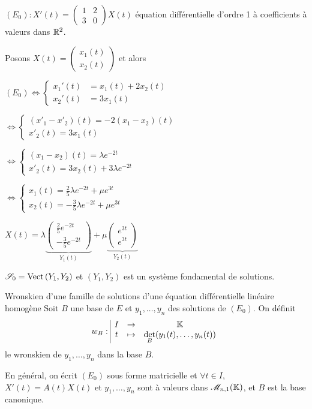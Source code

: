 \begin{exemple}
    $(E_0) : X'(t) = \begin{pmatrix}
        1 & 2 \\ 
        3 & 0
    \end{pmatrix} X(t)$ équation différentielle d'ordre 1 à coefficients à valeurs dans $\mathbb{R}^2$. 

    Posons $X(t) = \begin{pmatrix}
        x_1(t) \\ x_2(t)
    \end{pmatrix}$ et alors 

    $(E_0) \Leftrightarrow \begin{cases}
        x_1'(t) & = x_1(t) + 2x_2(t) \\
        x_2'(t) & = 3x_1(t)
    \end{cases}$

    $\Leftrightarrow \begin{cases}
        (x'_1 - x'_2)(t) = -2 (x_1 - x_2)(t) \\
        x'_2(t) = 3 x_1(t)
    \end{cases}$

    \svspace $\Leftrightarrow \begin{cases}
        (x_1 - x_2)(t) = \lambda e^{-2t} \\
        x'_2(t) = 3x_2(t) + 3 \lambda e^{-2t}
    \end{cases}$

    \svspace $\Leftrightarrow \begin{cases}
        x_1(t) = \frac 2 5 \lambda e^{-2t} + \mu e^{3t} \\
        x_2(t) = -\frac 3 5 \lambda e^{-2t} + \mu e^{3t}
    \end{cases}$

    \svspace $X(t) = \lambda \underbrace{\begin{pmatrix}
        \frac 2 5 e^{-2t} \\ -\frac 3 5 e^{-2t}
    \end{pmatrix}}_{Y_1(t)} + \mu \underbrace{\begin{pmatrix}
        e^{3t} \\ e^{3t}
    \end{pmatrix}}_{Y_2(t)}$

    $\mathscr S_0 = \operatorname{Vect} \, (Y_1, Y_2)$ et $(Y_1, Y_2)$ est un système fondamental de solutions.
\end{exemple}

\begin{definitionnt}{Wronskien d'une famille de solutions d'une équation différentielle linéaire homogène}{}
    Soit $B$ une base de $E$ et $y_1, \dots, y_n$ des solutions de $(E_0)$. 
    On définit $$w_B: \space \begin{array}{|ccc} \displaystyle I & \to & \displaystyle \mathbb{K} \\ \displaystyle t & \mapsto & \displaystyle \det_B (y_1(t), \dots, y_n(t)) \end{array}$$
    le wronskien de $y_1, \dots, y_n$ dans la base $B$.

    En général, on écrit $(E_0)$ sous forme matricielle et $\forall t \in I$, 
    $X'(t) = A(t) X(t)$ et 
    $y_1, \dots, y_n$ sont à valeurs dans $\mathscr M_{n, 1}(\mathbb{K})$, et $B$ est la base canonique. 
\end{definitionnt}

